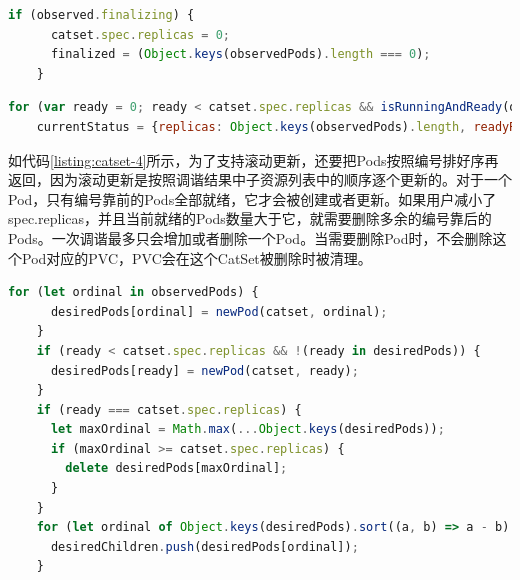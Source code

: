 \documentclass[macfonts,master]{njuthesis}
\begin{document}
\begin{lstlisting}[language=JavaScript,caption=删除后清理,label=listing:catset-2,gobble=4]
    if (observed.finalizing) {
      catset.spec.replicas = 0;
      finalized = (Object.keys(observedPods).length === 0);
    }
\end{lstlisting}

\begin{lstlisting}[language=JavaScript,caption=设置当前状态（status）,label=listing:catset-3,gobble=4]
    for (var ready = 0; ready < catset.spec.replicas && isRunningAndReady(observedPods[ready]); ready++);
    currentStatus = {replicas: Object.keys(observedPods).length, readyReplicas: ready};
\end{lstlisting}

如代码\ref{listing:catset-4}所示，为了支持滚动更新，还要把Pods按照编号排好序再返回，因为滚动更新是按照调谐结果中子资源列表中的顺序逐个更新的。对于一个Pod，只有编号靠前的Pods全部就绪，它才会被创建或者更新。如果用户减小了spec.replicas，并且当前就绪的Pods数量大于它，就需要删除多余的编号靠后的Pods。一次调谐最多只会增加或者删除一个Pod。当需要删除Pod时，不会删除这个Pod对应的PVC，PVC会在这个CatSet被删除时被清理。

\begin{lstlisting}[language=JavaScript,caption=返回的Pods,label=listing:catset-4,gobble=4]
    for (let ordinal in observedPods) {
      desiredPods[ordinal] = newPod(catset, ordinal);
    }
    if (ready < catset.spec.replicas && !(ready in desiredPods)) {
      desiredPods[ready] = newPod(catset, ready);
    }
    if (ready === catset.spec.replicas) {
      let maxOrdinal = Math.max(...Object.keys(desiredPods));
      if (maxOrdinal >= catset.spec.replicas) {
        delete desiredPods[maxOrdinal];
      }
    }
    for (let ordinal of Object.keys(desiredPods).sort((a, b) => a - b).reverse()) {
      desiredChildren.push(desiredPods[ordinal]);
    }
\end{lstlisting}
\end{document}
